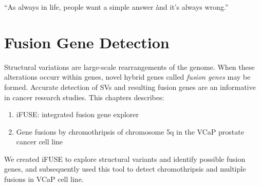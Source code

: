 \begin{savequote}[75mm]
“As always in life, people want a simple answer \. \. \. and it’s always wrong.”
\end{savequote}

\chapter{Fusion Gene Detection}\label{chapter:fusiongenes}
\setcounter{figure}{-1}
\setcounter{table}{-1}
\setcounter{section}{-1}

Structural variations are large-scale rearrangements of the genome. When these alterations occurr within genes, novel hybrid genes called \emph{fusion genes} may be formed. Accurate detection of SVs and resulting fusion genes are an informative in cancer research studies. This chapters describes:

\begin{enumerate}
\itemsep-0.5em
\item iFUSE: integrated fusion gene explorer
\item Gene fusions by chromothripsis of chromosome 5q in the VCaP prostate cancer cell line
\end{enumerate}

We created iFUSE to explore structural variants and identify possible fusion genes, and subsequently used this tool to detect chromothripsis and multiple fusions in VCaP cell line.

